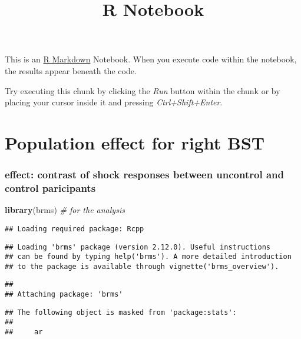 \documentclass[
]{article}
\title{R Notebook}
\author{}
\date{\vspace{-2.5em}}
\newenvironment{Shaded}{\begin{snugshade}}{\end{snugshade}}
\newcommand{\CommentTok}[1]{\textcolor[rgb]{0.56,0.35,0.01}{\textit{#1}}}
\newcommand{\KeywordTok}[1]{\textcolor[rgb]{0.13,0.29,0.53}{\textbf{#1}}}
\newcommand{\NormalTok}[1]{#1}
\begin{document}
\maketitle

This is an \href{http://rmarkdown.rstudio.com}{R Markdown} Notebook.
When you execute code within the notebook, the results appear beneath
the code.

Try executing this chunk by clicking the \emph{Run} button within the
chunk or by placing your cursor inside it and pressing
\emph{Ctrl+Shift+Enter}.

\hypertarget{population-effect-for-right-bst}{%
\section{Population effect for right
BST}\label{population-effect-for-right-bst}}

\hypertarget{effect-contrast-of-shock-responses-between-uncontrol-and-control-paricipants}{%
\subsubsection{effect: contrast of shock responses between uncontrol and
control
paricipants}\label{effect-contrast-of-shock-responses-between-uncontrol-and-control-paricipants}}

\begin{Shaded}
\begin{Highlighting}[]
\KeywordTok{library}\NormalTok{(brms) }\CommentTok{# for the analysis}
\end{Highlighting}
\end{Shaded}

\begin{verbatim}
## Loading required package: Rcpp
\end{verbatim}

\begin{verbatim}
## Loading 'brms' package (version 2.12.0). Useful instructions
## can be found by typing help('brms'). A more detailed introduction
## to the package is available through vignette('brms_overview').
\end{verbatim}

\begin{verbatim}
## 
## Attaching package: 'brms'
\end{verbatim}

\begin{verbatim}
## The following object is masked from 'package:stats':
## 
##     ar
\end{verbatim}
\end{document}
